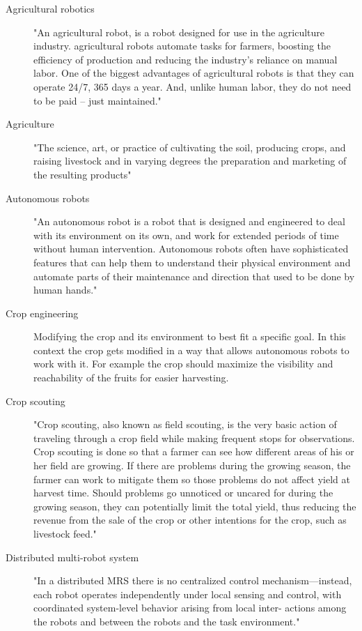 \documentclass{article}
\begin{document}
\begin{description}
    \item[Agricultural robotics] "An agricultural robot, is a robot designed for use in the agriculture industry. agricultural robots automate tasks for farmers, boosting the efficiency of production and reducing the industry’s reliance on manual labor. One of the biggest advantages of agricultural robots is that they can operate 24/7, 365 days a year. And, unlike human labor, they do not need to be paid – just maintained." \cite{MarketBusinessNews2020} 
    \item[Agriculture] "The science, art, or practice of cultivating the soil, producing crops, and raising livestock and in varying degrees the preparation and marketing of the resulting products" \cite{MerriamWebster2020}
    \item[Autonomous robots] "An autonomous robot is a robot that is designed and engineered to deal with its environment on its own, and work for extended periods of time without human intervention. Autonomous robots often have sophisticated features that can help them to understand their physical environment and automate parts of their maintenance and direction that used to be done by human hands." \cite{Technopedia2020}    
    \item[Crop engineering]  Modifying the crop and its environment to best fit a specific goal. In this context the crop gets modified in a way that allows autonomous robots to work with it. For example the crop should maximize the visibility and reachability of the fruits for easier harvesting.
    \item[Crop scouting]  "Crop scouting, also known as field scouting, is the very basic action of traveling through a crop field while making frequent stops for observations. Crop scouting is done so that a farmer can see how different areas of his or her field are growing. If there are problems during the growing season, the farmer can work to mitigate them so those problems do not affect yield at harvest time. Should problems go unnoticed or uncared for during the growing season, they can potentially limit the total yield, thus reducing the revenue from the sale of the crop or other intentions for the crop, such as livestock feed." \cite{Farms2020}
    \item[Distributed multi-robot system] "In a distributed MRS there is no centralized control mechanism—instead, each robot operates independently under local sensing and control, with coordinated system-level behavior arising from local inter- actions among the robots and between the robots and the task environment." \cite{Lerman2006}

\end{description}
\end{document}
